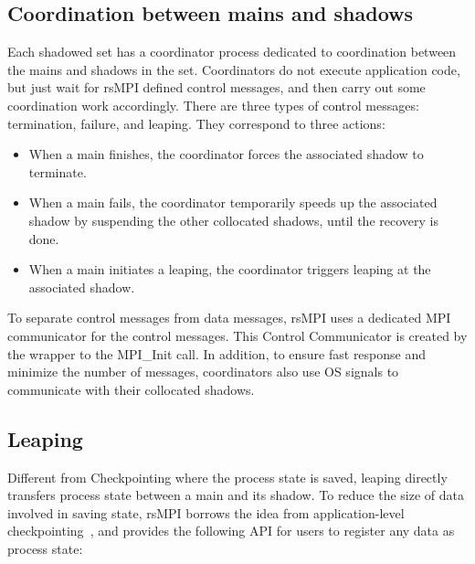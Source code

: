 \subsection{Coordination between mains and shadows}
Each shadowed set has a coordinator process dedicated to coordination between the mains and shadows in the set. 
Coordinators do not execute application code, but just wait for rsMPI defined control messages, and then carry out some 
coordination work accordingly. There are three types of control messages: termination, failure, and leaping. They correspond to three actions:
\begin{itemize}
  \item When a main finishes, the coordinator forces the associated shadow to terminate.
  \item When a main fails, the coordinator temporarily speeds up the associated shadow by suspending the other collocated shadows, until the recovery is done.
  \item When a main initiates a leaping, the coordinator triggers leaping at the associated shadow.
\end{itemize}
To separate control messages from data messages, rsMPI uses a dedicated MPI communicator for the control messages. This Control Communicator is created by the wrapper to the MPI\_Init call. In addition, to ensure fast response and minimize the number of messages, coordinators also use OS signals to communicate with their collocated shadows. %


\subsection{Leaping}
Different from Checkpointing where the process state is saved, leaping directly transfers process state between a main and its shadow. 
To reduce the size of data involved in saving state, rsMPI borrows the idea from application-level checkpointing~\cite{Beguelin97applicationlevel}, and provides the following API for users to register any data as process state:

